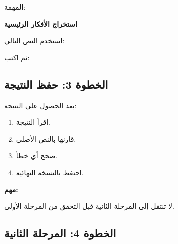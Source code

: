 \documentclass[a4paper]{article}
\begin{document}
المهمة:

\begin{center}

\textbf{استخراج الأفكار الرئيسية}

\end{center}

استخدم النص التالي:

\begin{center}


\end{center}

ثم اكتب:

\begin{center}


\end{center}



\subsection*{\khatt الخطوة 3: حفظ النتيجة}

بعد الحصول على النتيجة:

\begin{enumerate}

    \item اقرأ النتيجة.

    \item قارنها بالنص الأصلي.

    \item صحح أي خطأ.

    \item احتفظ بالنسخة النهائية.

\end{enumerate}

\textbf{مهم:}

لا تنتقل إلى المرحلة الثانية قبل التحقق من
المرحلة الأولى.



\subsection*{\khatt الخطوة 4: المرحلة الثانية}
\end{document}
